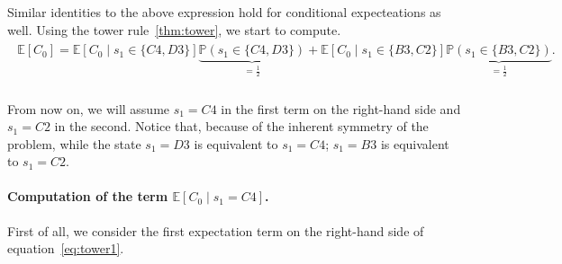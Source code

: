 Similar identities to the above expression hold for conditional expecteations as
well. Using the tower rule~\ref{thm:tower}, we start to compute.
\vspace{-0mm}
\begin{align}
    \begin{split}
    \mathbb{E}[C_0] = \mathbb{E}\left[ C_0 \mid s_1 \in \{C4, D3\} \right] 
    \underbrace{\mathbb{P}(s_1 \in \{C4, D3\})}_{=\frac{1}{2}} +
    \mathbb{E}\left[ C_0 \mid s_1 \in \{B3, C2\} 
    \right] \underbrace{\mathbb{P}(s_1 \in \{B3, C2\})}_{=\frac{1}{2}}.
    \end{split}
    \label{eq:tower1}
\end{align}
%
\hphantom{aha} \\[-2ex]
From now on, we will assume $s_1 = C4$ in the first term on the right-hand side
and $s_1 = C2$ in the second. Notice that, because of the inherent symmetry of
the problem, while the state $s_1 = D3$ is equivalent to $s_1 = C4$; $s_1 =
B3$ is equivalent to $s_1 = C2$.

\vspace{-3mm}
\paragraph{Computation of the term $\mathbb{E}\left[ C_0 \mid s_1 = C4
\right]$.} 
First of all, we consider the first expectation term on the right-hand side of
equation~\eqref{eq:tower1}.

